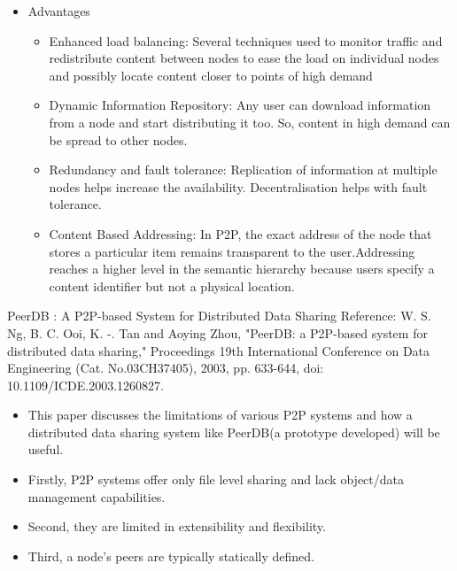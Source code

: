 \documentclass[9pt]{beamer}
\begin{document}
\begin{frame}{}
\begin{itemize}
    \item Advantages

\begin{itemize}
    \item Enhanced load balancing:
Several techniques used to monitor traffic and redistribute content between nodes to ease the load on individual nodes and possibly locate content closer to points of high demand 
\item Dynamic Information Repository:
Any user can download information from a node and start distributing it too. So, content in high demand can be spread to other nodes. 
\item Redundancy and fault tolerance:
Replication of information at multiple nodes helps increase the availability. Decentralisation helps with fault tolerance. 
\item Content Based Addressing:
In P2P, the exact address of the node that stores a particular item remains transparent to the user.Addressing reaches a higher level in the semantic hierarchy because users specify a content identifier but not a physical location.
\end{itemize}
\end{itemize}
    
\end{frame}

\begin{frame}{PeerDB : A P2P-based System for Distributed Data Sharing}
\small {Reference: W. S. Ng, B. C. Ooi, K. -. Tan and Aoying Zhou, "PeerDB: a P2P-based system for distributed data sharing," Proceedings 19th International Conference on Data Engineering (Cat. No.03CH37405), 2003, pp. 633-644, doi: 10.1109/ICDE.2003.1260827.}
\break
\begin{itemize}
    \item This paper discusses the limitations of various P2P systems and how a distributed data sharing system like PeerDB(a prototype developed) will be useful. 
    \item Firstly, P2P systems offer only file level sharing and lack object/data management capabilities. 
    \item Second, they are limited in extensibility and flexibility.
    \item Third, a node's peers are typically statically defined. 
\end{itemize}
\end{frame}
\end{document}
